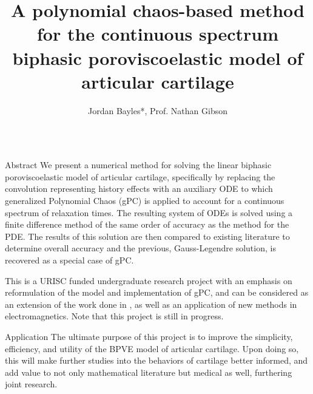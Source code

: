 \documentclass[final]{beamer} %
\title{A polynomial chaos-based method for the continuous spectrum biphasic poroviscoelastic model of articular cartilage}
\author[*baylesj@onid.orst.edu]{Jordan Bayles*, Prof. Nathan Gibson}
\institute[Department of Mathematics, Oregon State University]{Department of Mathematics, Oregon State University}
\begin{document}
\begin{frame}[t]

\begin{columns}[t]
\begin{column}{0.28\paperwidth}

\begin{alertblock}{Abstract}
We present a numerical method for solving the linear biphasic poroviscoelastic
model of articular cartilage, specifically by 
replacing the convolution representing history effects with an
auxiliary ODE
to which generalized Polynomial Chaos (gPC) is applied to account for
a continuous spectrum of relaxation times.
The
resulting system of 
ODEs is solved using a finite difference method of the same order of
accuracy as the method for the PDE. The results of this solution
are then compared to existing literature to determine overall accuracy and
the previous, Gauss-Legendre solution, is recovered as a special case of gPC.

\end{alertblock}
This is a URISC funded undergraduate research project with an emphasis
on reformulation of the model and implementation of
gPC, and can be considered as an extension of the work done in \cite{stuebner},
\cite{schugart} as well as an application of new methods in electromagnetics. 
Note that this project is still in progress.

\begin{block}{Application}
The ultimate purpose of this project is to improve the simplicity, efficiency, and
utility of the BPVE model of articular cartilage. Upon doing so, this will make further
studies into the behaviors of cartilage better informed, and add value to not only
mathematical literature but medical as well, furthering joint research.
\end{block}


\end{column}
\end{columns}
\end{frame}
\end{document}
